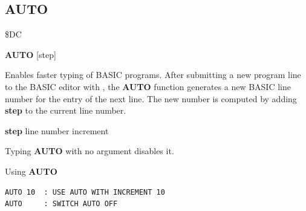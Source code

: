 
\newpage
\subsection{AUTO}
\begin{description}[leftmargin=2cm,style=nextline]
\item [Token:] \$DC
\item [Format:]
  {\bf AUTO} [step]
\item [Usage:] Enables faster typing of BASIC programs.
  After submitting a new program line to the BASIC editor with
  , the {\bf AUTO} function generates a new BASIC line
  number for the entry of the next line. The new number is
  computed by adding {\bf step} to the current line number.

  {\bf step} line number increment

  Typing {\bf AUTO} with no argument disables it.

\item [Examples:] Using {\bf AUTO}
\begin{tcolorbox}[colback=black,coltext=white]
\verbatimfont{\codefont}
\begin{verbatim}
AUTO 10  : USE AUTO WITH INCREMENT 10
AUTO     : SWITCH AUTO OFF
\end{verbatim}
\end{tcolorbox}
\end{description}


\newpage
